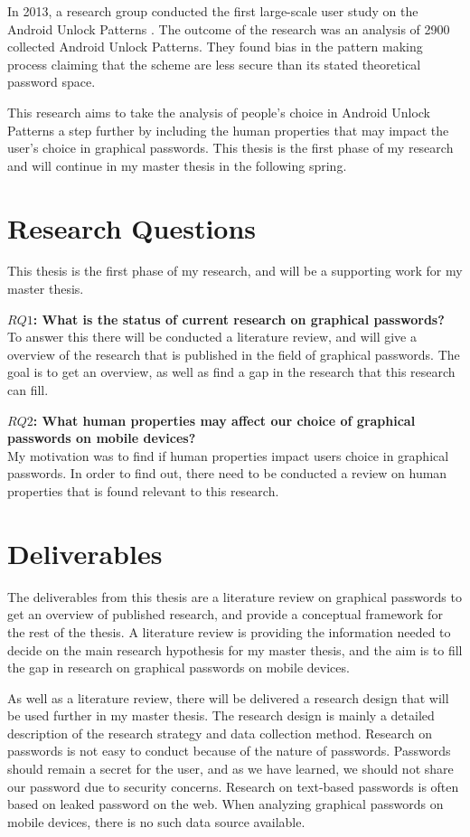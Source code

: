   In 2013, a research group conducted the first large-scale user study on the Android Unlock Patterns \cite{Uellenbeck}. The outcome of the research was an analysis of 2900 collected Android Unlock Patterns. They found bias in the pattern making process claiming that the scheme are less secure than its stated theoretical password space.

  This research aims to take the analysis of people's choice in Android Unlock Patterns a step further by including the human properties that may impact the user's choice in graphical passwords. This thesis is the first phase of my research and will continue in my master thesis in the following spring.

  \section{Research Questions}
    
    This thesis is the first phase of my research, and will be a supporting work for my master thesis. 

    {\bf $RQ1$: What is the status of current research on graphical passwords?} \\
    To answer this there will be conducted a literature review, and will give a overview of the research that is published in the field of graphical passwords. The goal is to get an overview, as well as find a gap in the research that this research can fill. 

    {\bf $RQ2$: What human properties may affect our choice of graphical passwords on mobile devices?}\\
    My motivation was to find if human properties impact users choice in graphical passwords. In order to find out, there need to be conducted a review on human properties that is found relevant to this research. 

  \section{Deliverables}

    The deliverables from this thesis are a literature review on graphical passwords to get an overview of published research, and provide a conceptual framework for the rest of the thesis. A literature review is providing the information needed to decide on the main research hypothesis for my master thesis, and the aim is to fill the gap in research on graphical passwords on mobile devices.

  As well as a literature review, there will be delivered a research design that will be used further in my master thesis. The research design is mainly a detailed description of the research strategy and data collection method. Research on passwords is not easy to conduct because of the nature of passwords. Passwords should remain a secret for the user, and as we have learned, we should not share our password due to security concerns. Research on text-based passwords is often based on leaked password on the web. When analyzing graphical passwords on mobile devices, there is no such data source available.
  
